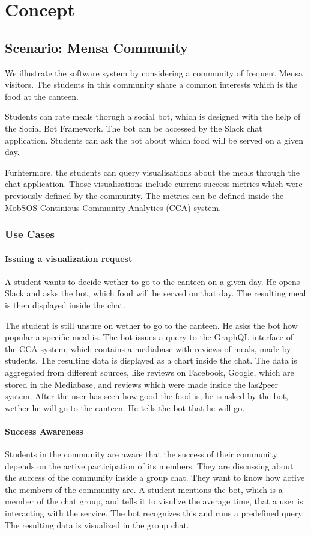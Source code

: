 \chapter{Concept}
\section{Scenario: Mensa Community}
We illustrate the software system by considering a community of frequent Mensa visitors. The students in this community share a common interests which is the food at the canteen.

Students can rate meals thorugh a social bot, which is designed with the help of the Social Bot Framework. The bot can be accessed by the Slack chat application. Students can ask the bot about which food will be served on a given day.

Furhtermore, the students can query visualisations about the meals through the chat application. Those visualisations include current success metrics which were previously defined by the community. The metrics can be defined inside the MobSOS Continious Community Analytics (CCA) system.

\subsection{Use Cases}

\subsubsection{Issuing a visualization request} A student wants to decide wether to go to the canteen on a given day. He opens Slack and asks the bot, which food will be served on that day. The resulting meal is then displayed inside the chat.

The student is still unsure on wether to go to the canteen. He asks the bot how popular a specific meal is. The bot issues a query to the GraphQL interface of the CCA system, which contains a mediabase with reviews of meals, made by students. The resulting data is displayed as a chart inside the chat. The data is aggregated from different sources, like reviews on Facebook, Google, which are stored in the Mediabase, and reviews which were made inside the las2peer system. After the user has seen how good the food is, he is asked by the bot, wether he will go to the canteen. He tells the bot that he will go.

\subsubsection{Success Awareness} Students in the community are aware that the success of their community depends on the active participation of its members. They are discussing about the success of the community inside a group chat. They want to know how active the members of the community are. A student mentions the bot, which is a member of the chat group, and tells it to visulize the  average time, that a user is interacting with the service. The bot recognizes this and runs a predefined query. The resulting data is visualized in the group chat.

